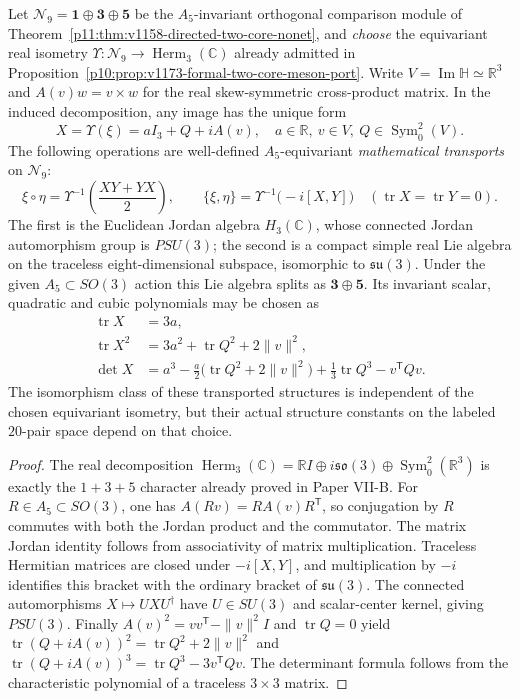 \documentclass[12pt,a4paper]{article}
\begin{document}
\begin{theorem}
\label{p11:thm:v159-nonet-jordan-lie-structure}
Let $\mathcal N_9=\mathbf1\oplus\mathbf3\oplus\mathbf5$
be the $A_5$-invariant orthogonal comparison module of
Theorem~\ref{p11:thm:v1158-directed-two-core-nonet}, and \emph{choose}
the equivariant real isometry
$\Upsilon:\mathcal N_9\to\operatorname{Herm}_3(\mathbb C)$
already admitted in
Proposition~\ref{p10:prop:v1173-formal-two-core-meson-port}.
Write $V=\operatorname{Im}\mathbb H\simeq\mathbb R^3$ and
$A(v)w=v\times w$ for the real skew-symmetric cross-product matrix.
In the induced decomposition, any image has the unique form
\[
\boxed{X=\Upsilon(\xi)=aI_3+Q+iA(v),\quad
 a\in\mathbb R,\ v\in V,\ Q\in\operatorname{Sym}_0^2(V).}
\]
The following operations are well-defined $A_5$-equivariant
\emph{mathematical transports} on $\mathcal N_9$:
\[
\xi\circ\eta=\Upsilon^{-1}\!\left(\frac{XY+YX}{2}\right),\qquad
\{\xi,\eta\}=\Upsilon^{-1}\!\bigl(-i[X,Y]\bigr)
\quad(\operatorname{tr}X=\operatorname{tr}Y=0).
\]
The first is the Euclidean Jordan algebra
$H_3(\mathbb C)$, whose connected Jordan automorphism group is
$PSU(3)$; the second is a compact simple real Lie algebra on the
traceless eight-dimensional subspace, isomorphic to $\mathfrak{su}(3)$.
Under the given $A_5\subset SO(3)$ action this Lie algebra splits as
$\mathbf3\oplus\mathbf5$. Its invariant scalar, quadratic and cubic
polynomials may be chosen as
\[
\boxed{\begin{aligned}
 \operatorname{tr}X&=3a,\\
 \operatorname{tr}X^2&=3a^2+\operatorname{tr}Q^2+2\|v\|^2,\\
 \det X&=a^3-\frac a2\bigl(\operatorname{tr}Q^2+2\|v\|^2\bigr)
             +\frac13\operatorname{tr}Q^3-v^{\mathsf T}Qv.
\end{aligned}}
\]
The isomorphism class of these transported structures is independent
of the chosen equivariant isometry, but their actual structure
constants on the labeled $20$-pair space depend on that choice.
\end{theorem}
\begin{proof}
The real decomposition
$\operatorname{Herm}_3(\mathbb C)=\mathbb RI
 \oplus i\mathfrak{so}(3)\oplus\operatorname{Sym}_0^2(\mathbb R^3)$
is exactly the $1+3+5$ character already proved in Paper VII-B.
For $R\in A_5\subset SO(3)$, one has
$A(Rv)=RA(v)R^{\mathsf T}$, so conjugation by $R$ commutes with
both the Jordan product and the commutator.
The matrix Jordan identity follows from associativity of matrix
multiplication. Traceless Hermitian matrices are closed under
$-i[X,Y]$, and multiplication by $-i$ identifies this bracket with
the ordinary bracket of $\mathfrak{su}(3)$.
The connected automorphisms $X\mapsto UXU^\dagger$ have
$U\in SU(3)$ and scalar-center kernel, giving $PSU(3)$.
Finally $A(v)^2=vv^{\mathsf T}-\|v\|^2I$ and
$\operatorname{tr}Q=0$ yield
$\operatorname{tr}(Q+iA(v))^2=\operatorname{tr}Q^2+2\|v\|^2$ and
$\operatorname{tr}(Q+iA(v))^3=\operatorname{tr}Q^3-3v^{\mathsf T}Qv$.
The determinant formula follows from the characteristic polynomial
of a traceless $3\times3$ matrix.
\end{proof}
\end{document}
